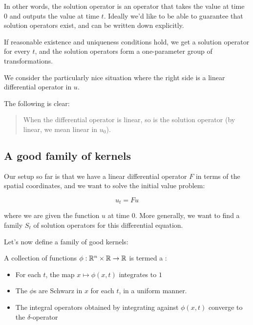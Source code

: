 \documentclass[a4paper]{amsart}
\begin{document}
In other words, the solution operator is an operator that takes the
value at time $0$ and outputs the value at time $t$. Ideally we'd like
to be able to guarantee that solution operators exist, and can be
written down explicitly.

If reasonable existence and uniqueness conditions hold, we get a
solution operator for every $t$, and the solution operators form a
one-parameter group of transformations.

We consider the particularly nice situation where the right side is a
linear differential operator in $u$.

The following is clear:

\begin{quote}
  When the differential operator is linear, so is the solution
  operator (by linear, we mean linear in $u_0$).
\end{quote}

\subsection{A good family of kernels}

Our setup so far is that we have a linear differential operator $F$ in
terms of the spatial coordinates, and we want to solve the initial
value problem:

$$u_t = Fu$$

where we are given the function $u$ at time $0$. More generally, we
want to find a family $S_t$ of solution operators for this
differential equation.

Let's now define a family of good kernels:

\begin{definer}
  A collection of functions $\phi:\mathbb{R}^n \times \mathbb{R} \to \mathbb{R}$ is termed a
  :

  \begin{itemize}

  \item For each $t$, the map $x \mapsto \phi(x,t)$ integrates to $1$

  \item The $\phi$s are Schwarz in $x$ for each $t$, in a uniform
    manner.

  \item The integral operators obtained by integrating against
    $\phi(x,t)$ converge to the $\delta$-operator

  \end{itemize}

\end{definer}
\end{document}
